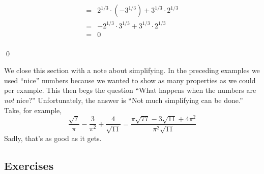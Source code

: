 \documentclass{ximera}
\begin{document}
\begin{example}
\begin{enumerate}
\[\begin{array}{rclr}
& = & 2^{1/3} \cdot (-3^{1/3}) +3^{1/3} \cdot 2^{1/3}  & \\ [3pt]

& = &  - 2^{1/3} \cdot 3^{1/3} +3^{1/3} \cdot 2^{1/3}  & \\ [3pt]

& = & 0 & \\ \end{array} \] 

\vspace{-.3in} \qed

\end{enumerate}

\end{example}

\medskip

We close this section with a note about simplifying.  In the preceding examples we used ``nice'' numbers because we wanted to show as many properties as we could per example. This then begs the question ``What happens when the numbers are \emph{not} nice?''  Unfortunately, the answer is ``Not much simplifying can be done.''  Take, for example,\[\frac{\sqrt{7}}{\pi} - \frac{3}{\pi^{2}} + \frac{4}{\sqrt{11}} = \frac{\pi\sqrt{77} - 3\sqrt{11} + 4\pi^{2}}{\pi^{2}\sqrt{11}}\]Sadly, that's as good as it gets.

\newpage

\subsection{Exercises}


\closegraphsfile
\end{document}
